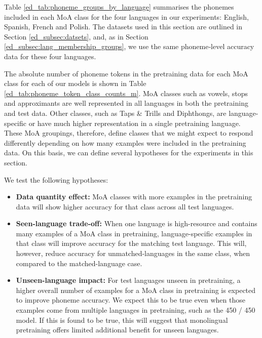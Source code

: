 Table \ref{ed_tab:phoneme_groups_by_language} summarises the phonemes included in each MoA class for the four languages in our experiments: English, Spanish, French and Polish. The datasets used in this section are outlined in Section \ref{ed_subsec:datsets}, and, as in Section \ref{ed_subsec:lang_membership_groups}, we use the same phoneme‑level accuracy data for these four languages.

The absolute number of phoneme tokens in the pretraining data for each MoA class for each of our models is shown in Table \ref{ed_tab:phoneme_token_class_counts_m}. MoA classes such as vowels, stops and approximants are well represented in all languages in both the pretraining and test data. Other classes, such as Taps \& Trills and Diphthongs, are language-specific or have much higher representation in a single pretraining language. These MoA groupings, therefore, define classes that we might expect to respond differently depending on how many examples were included in the pretraining data. On this basis, we can define several hypotheses for the experiments in this section.


We test the following hypotheses:

\begin{itemize}
    \item \textbf{Data quantity effect:} MoA classes with more examples in the pretraining data will show higher accuracy for that class across all test languages.
    
    \item \textbf{Seen-language trade-off:} When one language is high-resource and contains many examples of a MoA class in pretraining, language-specific examples in that class will improve accuracy for the matching test language. This will, however, reduce accuracy for unmatched-languages in the same class, when compared to the matched-language case.
    
    \item \textbf{Unseen-language impact:} For test languages unseen in pretraining, a higher overall number of examples for a MoA class in pretraining is expected to improve phoneme accuracy. We expect this to be true even when those examples come from multiple languages in pretraining, such as the 450 / 450 model. If this is found to be true, this will suggest that monolingual pretraining offers limited additional benefit for unseen languages.
\end{itemize}


